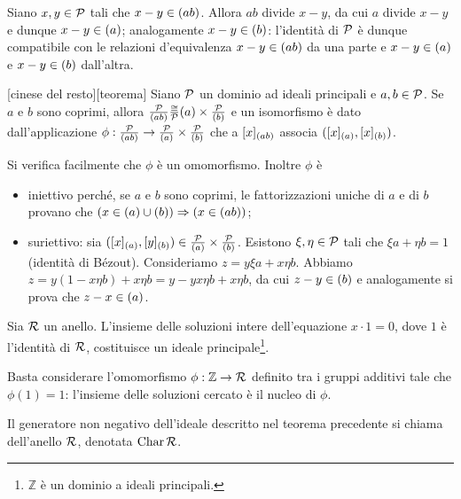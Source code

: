 \Proof Siano $x, y \in \mathcal{P}$ tali che $x - y \in \left ( ab \right )$. Allora $ab$ divide $x - y$, da cui $a$ divide $x - y$ e dunque $x - y \in \left ( a \right )$; analogamente $x - y \in \left ( b \right )$: l'identit\`a di $\mathcal{P}$ \`e dunque compatibile con le relazioni d'equivalenza $x - y \in \left ( ab \right )$ da una parte e $x - y \in \left ( a \right )$ e $x - y \in \left ( b \right )$ dall'altra. \EndProof
\begin{Theorem}
	[cinese del resto][teorema] Siano $\mathcal{P}$ un dominio ad ideali principali e $a, b \in \mathcal{P}$. Se $a$ e $b$ sono coprimi, allora $\frac{\mathcal{P}}{\left ( ab \right )} \frac{\cong}{\mathcal{P}}{\left ( a \right )} \times \frac{\mathcal{P}}{\left ( b \right )}$ e un isomorfismo \`e dato dall'applicazione $\phi: \frac{\mathcal{P}}{\left ( ab \right )} \rightarrow \frac{\mathcal{P}}{\left ( a \right )} \times \frac{\mathcal{P}}{\left ( b \right )}$ che a $\EquivalenceClass{x}[\SpanIdeal{ab}]$ associa $(\EquivalenceClass{x}[\SpanIdeal{a}],\EquivalenceClass{x}[\SpanIdeal{b}])$.
\end{Theorem}
\par Si verifica facilmente che $\phi$ \`e un omomorfismo. Inoltre $\phi$ \`e
\begin{itemize}
	\item iniettivo perch\'e, se $a$ e $b$ sono coprimi, le fattorizzazioni uniche di $a$ e di $b$ provano che $\left ( x \in \left ( a \right ) \cup \left ( b \right ) \right ) \Rightarrow \left ( x \in \left ( ab \right ) \right )$;
	\item suriettivo: sia $(\EquivalenceClass{x}[\SpanIdeal{a}],\EquivalenceClass{y}[\SpanIdeal{b}]) \in \Quotient{\PID}{\SpanIdeal{a}} \times \Quotient{\PID}{\SpanIdeal{b}}$. Esistono $\xi, \eta \in \mathcal{P}$ tali che $\xi a + \eta b = 1$ (identit\`a di B\'ezout). Consideriamo $z = y \xi a + x \eta b$. Abbiamo $z = y ( 1 - x \eta b) + x \eta b = y - yx \eta b + x \eta b$, da cui $z - y \in \left ( b \right )$ e analogamente si prova che $z - x \in \left ( a \right )$. \EndProof 
\end{itemize}
\begin{Theorem}\label{ThCaratteristica}
	Sia $\mathcal{R}$ un anello. L'insieme delle soluzioni intere dell'equazione $x \cdot 1 = 0$, dove $1$ \`e l'identit\`a di $\mathcal{R}$, costituisce un ideale principale\footnote{$\mathbb{Z}$ \`e un dominio a ideali principali.}.
\end{Theorem}
\Proof Basta considerare l'omomorfismo $\phi: \mathbb{Z} \rightarrow \mathcal{R}$ definito tra i gruppi additivi tale che $\phi(1) = 1$: l'insieme delle soluzioni cercato \`e il nucleo di $\phi$. \EndProof
\begin{Definition}
	Il generatore non negativo dell'ideale descritto nel teorema precedente si chiama  dell'anello $\mathcal{R}$, denotata $\operatorname{Char}{\mathcal{R}}$.
\end{Definition}
